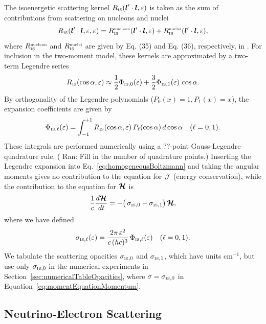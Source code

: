 \documentclass[10pt,preprint]{aastex}
\newcommand{\ee}[1]{{\color{red} #1}}
\begin{document}
The isoenergetic scattering kernel $R_{\mbox{\tiny IS}}(\boldsymbol{l}'\cdot\boldsymbol{l},\varepsilon)$ is taken as the sum of contributions from scattering on nucleons and nuclei
\begin{equation}
  R_{\mbox{\tiny IS}}(\boldsymbol{l}'\cdot\boldsymbol{l},\varepsilon,\varepsilon) = R_{\mbox{\tiny IS}}^{\mbox{\tiny nucleon}}(\boldsymbol{l}'\cdot\boldsymbol{l},\varepsilon) + R_{\mbox{\tiny IS}}^{\mbox{\tiny nuclei}}(\boldsymbol{l}'\cdot\boldsymbol{l},\varepsilon),
\end{equation}
where $R_{\mbox{\tiny IS}}^{\mbox{\tiny nucleon}}$ and $R_{\mbox{\tiny IS}}^{\mbox{\tiny nuclei}}$ are given by Eq. (35) and Eq. (36), respectively, in \citet{mezzacappaBruenn_1993a}.  
For inclusion in the two-moment model, these kernels are approximated by a two-term Legendre series
\begin{align}
  R_{\mbox{\tiny IS}}(\cos\alpha,\varepsilon) \approx \frac{1}{2} \Phi_{\mbox{\tiny IS},0}(\varepsilon) + \frac{3}{2}\Phi_{\mbox{\tiny IS},1}(\varepsilon)\,\cos\alpha.
\end{align}
By orthogonality of the Legendre polynomials ($P_{0}(x)=1,P_{1}(x)=x$), the expansion coefficients are given by
\begin{equation}
  \Phi_{\mbox{\tiny IS},\ell}(\varepsilon)
  =\int_{-1}^{+1}R_{\mbox{\tiny IS}}(\cos\alpha,\varepsilon)\,P_{\ell}(\cos\alpha)\,d\cos\alpha \quad (\ell=0,1).  
\end{equation}
These integrals are performed numerically using a ??-point Gauss-Legendre quadrature rule.  (\ee{Ran: Fill in the number of quadrature points}.)
Inserting the Legendre expansion into Eq.~\eqref{eq:homogeneousBoltzmann} and taking the angular moments gives no contribution to the equation for $\mathcal{J}$ (energy conservation), while the contribution to the equation for $\boldsymbol{\mathcal{H}}$ is
\begin{equation}
  \frac{1}{c}\frac{d \boldsymbol{\mathcal{H}}}{d t}
  =-\big(\,\sigma_{\mbox{\tiny IS},0}-\sigma_{\mbox{\tiny IS},1}\big)\,\boldsymbol{\mathcal{H}},
\end{equation}
where we have defined
\begin{equation}
  \sigma_{\mbox{\tiny IS},\ell}(\varepsilon)
  =\frac{2\pi\,\varepsilon^{2}}{c\,(hc)^{3}}\,\Phi_{\mbox{\tiny IS},\ell}(\varepsilon) \quad (\ell=0,1).  
\end{equation}
We tabulate the scattering opacities $\sigma_{\mbox{\tiny IS},0}$ and $\sigma_{\mbox{\tiny IS},1}$, which have units cm$^{-1}$, but use only $\sigma_{\mbox{\tiny IS},0}$ in the numerical experiments in Section~\ref{sec:numericalTableOpacities}, where $\sigma=\sigma_{\mbox{\tiny IS},0}$ in Equation~\eqref{eq:momentEquationMomentum}.  

\subsection{Neutrino-Electron Scattering}
\end{document}
